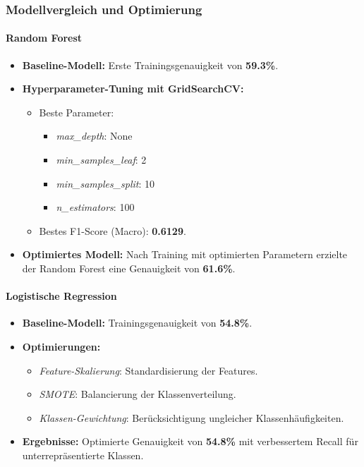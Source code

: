 \documentclass[a4paper,12pt]{article}
\begin{document}
\subsubsection{Modellvergleich und Optimierung}

\paragraph{Random Forest}
\begin{itemize}
    \item \textbf{Baseline-Modell:} Erste Trainingsgenauigkeit von \textbf{59.3\%}.
    \item \textbf{Hyperparameter-Tuning mit GridSearchCV:}
    \begin{itemize}
        \item Beste Parameter:
        \begin{itemize}
            \item \textit{max\_depth}: None
            \item \textit{min\_samples\_leaf}: 2
            \item \textit{min\_samples\_split}: 10
            \item \textit{n\_estimators}: 100
        \end{itemize}
        \item Bestes F1-Score (Macro): \textbf{0.6129}.
    \end{itemize}
    \item \textbf{Optimiertes Modell:} Nach Training mit optimierten Parametern erzielte der Random Forest eine Genauigkeit von \textbf{61.6\%}.
\end{itemize}

\paragraph{Logistische Regression}
\begin{itemize}
    \item \textbf{Baseline-Modell:} Trainingsgenauigkeit von \textbf{54.8\%}.
    \item \textbf{Optimierungen:}
    \begin{itemize}
        \item \textit{Feature-Skalierung}: Standardisierung der Features.
        \item \textit{SMOTE}: Balancierung der Klassenverteilung.
        \item \textit{Klassen-Gewichtung}: Berücksichtigung ungleicher Klassenhäufigkeiten.
    \end{itemize}
    \item \textbf{Ergebnisse:} Optimierte Genauigkeit von \textbf{54.8\%} mit verbessertem Recall für unterrepräsentierte Klassen.
\end{itemize}
\end{document}
